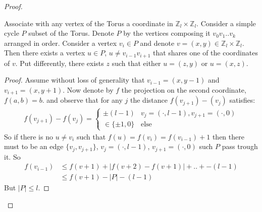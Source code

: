 \begin{proof}
  \begin{claim}
    \label{claim:inter}
Associate with any vertex of the Torus a coordinate in $\mathbb{Z}_{l} \times \mathbb{Z}_{l}$. Consider a simple cycle $P$ subset of the Torus. Denote $P$ by the vertices composing it $v_{0}v_{1}..v_{k}$ arranged in order. Consider a vertex $v_{i} \in P$ and denote $v = \left( x,y \right) \in $$ \mathbb{Z}_{l} \times \mathbb{Z}_{l}$. Then there exists a vertex $u \in P$, $ u \neq v_{i-1}v_{i+1}$ that shares one of the coordinates of $v$. Put differently, there exists $z$ such that either  $u = \left( z,y \right)$ or $u = \left( x,z \right)$.
  \end{claim}

  \begin{proof} 
Assume without loss of generality that $v_{i-1} = \left( x, y -1 \right)$ and $v_{i+1} =\left( x,y+1 \right)$. Now denote by $f$ the projection on the second coordinate, $f(a,b)= b$. and observe that for any $j$ the distance $f\left( v_{j+1}\right) - \left( v_{j}  \right)$ satisfies:
    \begin{equation*}
      \begin{split}
      f\left( v_{j+1}\right) - f \left( v_{j}  \right) = 
        \begin{cases}
          \pm \left( l - 1 \right)  & v_{j} = \left( \cdot, l -1 \right), v_{j+1} = \left( \cdot, 0  \right)  \\
          \in \{ \pm 1 , 0\} & \text{else}
        \end{cases}
      \end{split}
    \end{equation*}
    So if there is no $u \neq v_{i}$ such that $f(u) = f(v_{i}) = f(v_{i-1})+1$ then there must to be an edge $\{v_{j},v_{j+1}\}$, $v_{j} = \left( \cdot, l -1 \right)$, $ v_{j+1} = \left( \cdot, 0  \right)$ such $P$ pass trough it. So  
    \begin{equation*}
      \begin{split}
        f\left( v_{i-1} \right) & \le f\left( v+1 \right) +  |f\left( v+2 \right) -  f\left( v+1 \right)| + .. + -\left( l - 1 \right) \\ 
        & \le f(v+1) - |P| - \left(l-1\right)  
      \end{split}
    \end{equation*}
    But $|P| \le l$. 
  \end{proof}
  \begin{figure}[h]
\end{figure}
\end{proof}
